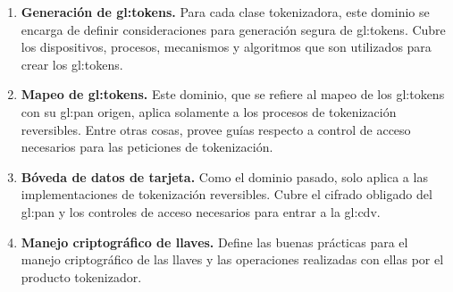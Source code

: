 \begin{enumerate}

  \item \label{dm:gen_tokens} \textbf{Generación de \glspl{gl:token}.}
    Para cada clase tokenizadora, este dominio se encarga de definir
    consideraciones para generación segura de \glspl{gl:token}. Cubre los
    dispositivos, procesos, mecanismos y algoritmos que son utilizados para
    crear los \glspl{gl:token}.

  \item \label{dm:mapeo_tokens} \textbf{Mapeo de \glspl{gl:token}.}
    Este dominio, que se refiere al mapeo de los \glspl{gl:token} con su
    \gls{gl:pan} origen, aplica solamente a los procesos de tokenización
    reversibles. Entre otras cosas, provee guías respecto a control de acceso
    necesarios para las peticiones de tokenización.

  \item \label{dm:card_data} \textbf{Bóveda de datos de tarjeta.}
    Como el dominio pasado, solo aplica a las implementaciones de tokenización
    reversibles. Cubre el cifrado obligado del \gls{gl:pan} y los controles de
    acceso necesarios para entrar a la \gls{gl:cdv}.

  \item \label{dm:man_llaves} \textbf{Manejo criptográfico de llaves.}
    Define las buenas prácticas para el manejo criptográfico de las llaves y
    las operaciones realizadas con ellas por el producto tokenizador.

\end{enumerate}






